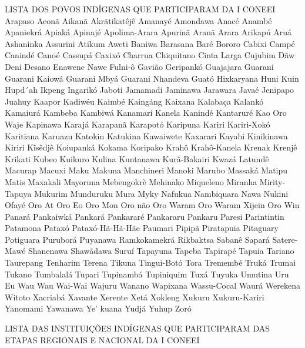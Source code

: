 \documentclass[
]{book}
\begin{document}
LISTA DOS POVOS INDÍGENAS QUE PARTICIPARAM DA I CONEEI
Arapaso Aconã Aikanã
Akrãtikatêjê Amanayé Amondawa
Anacé Anambé Apaniekrá
Apiaká Apinajé Apolima-Arara
Apurinã Aranã Arara
Arikapú Aruá Ashaninka
Assurini Atikum Aweti
Baniwa Barasana Baré
Bororo Cabixi Campé
Canindé Canoé Cassupá
Caxixó Charrua Chiquitano
Cinta Larga Cujubim Dãw
Deni Desano Enawene Nawe
Fulni-ô Gavião Geripankó
Guajajara Guarani Guarani Kaiowá
Guarani Mbyá Guarani Nhandeva Guató
Hixkaryana Huni Kuin Hupd´ah
Ikpeng Ingarikó Jaboti
Jamamadi Jaminawa Jarawara
Javaé Jenipapo Juahuy
Kaapor Kadiwéu Kaimbé
Kaingáng Kaixana Kalabaça
Kalankó Kamaiurá Kambeba
Kambiwá Kanamari Kanela
Kanindé Kantaruré Kao Oro Waje
Kapinawa Karajá Karapanã
Karapotó Karipuna Kariri
Kariri-Xokó Karitiana Karuazu
Katokin Katukina Kawaiwete
Kaxarari Kayabi Kinikinawa
Kiriri Kĩsêdjê Koiupanká
Kokama Koripako Krahô
Krahô-Kanela Krenak Krenjê
Krikati Kubeo Kuikuro
Kulina Kuntanawa Kurâ-Bakairi
Kwazá Latundê Macurap
Macuxi Maku Makuna
Manchineri Manoki Marubo
Massaká Matipu Matis
Maxakali Mayoruna Mebengokrè
Mehinako Miqueleno Miranha
Mirity-Tapuya Mukurim Munduruku
Mura Myky Nafukua
Nambiquara Nawa Nukini
Ofayé Oro At Oro Eo
Oro Mon Oro não Oro Waram
Oro Waram Xijein Oro Win Panará
Pankaiwká Pankará Pankararé
Pankararu Pankaru Paresi
Parintintin Patamona Pataxó
Pataxó-Hã-Hã-Hãe Paumari Pipipã
Piratapuia Pitaguary Potiguara
Puruborá Puyanawa Ramkokamekrá
Rikbaktsa Sabanê Sapará
Satere-Mawé Shanenawa Shawãdawa
Suruí Tapayuna Tapeba
Tapirapé Tapuia Tariano
Taurepang Tenharim Terena
Tikuna Tingui-Botó Tora
Tremembé Truká Trumai
Tukano Tumbalalá Tupari
Tupinambá Tupiniquim Tuxá
Tuyuka Umutina Uru Eu Wau Wau
Wai-Wai Wajuru Wanano
Wapixana Wassu-Cocal Waurá
Werekena Witoto Xacriabá
Xavante Xerente Xetá
Xokleng Xukuru Xukuru-Kariri
Yanomami Yawanawa Ye' kuana
Yudjá Yuhup Zoró

LISTA DAS INSTITUIÇÕES INDÍGENAS QUE PARTICIPARAM DAS ETAPAS REGIONAIS E NACIONAL DA I CONEEI
\end{document}
